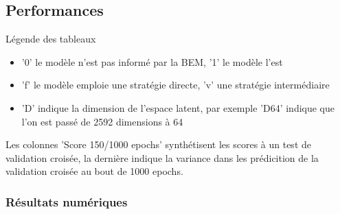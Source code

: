 \documentclass[
11pt,notheorems,hyperref={pdfauthor=whatever}
]{beamer}
\begin{document}
\subsection{Performances}

\begin{frame}{Légende des tableaux}
    \begin{itemize}
        \item '0' le modèle n'est pas informé par la BEM, '1' le modèle l'est
        \item 'f' le modèle emploie une stratégie directe, 'v' une stratégie intermédiaire
        \item 'D' indique la dimension de l'espace latent, par exemple 'D64' indique que l'on est passé de 2592 dimensions à 64
    \end{itemize}
    Les colonnes 'Score 150/1000 epochs' synthétisent les scores à un test de validation croisée, la dernière indique la variance dans les prédicition de la validation croisée au bout de 1000 epochs.
\end{frame}

\subsubsection{Résultats numériques}
\end{document}
